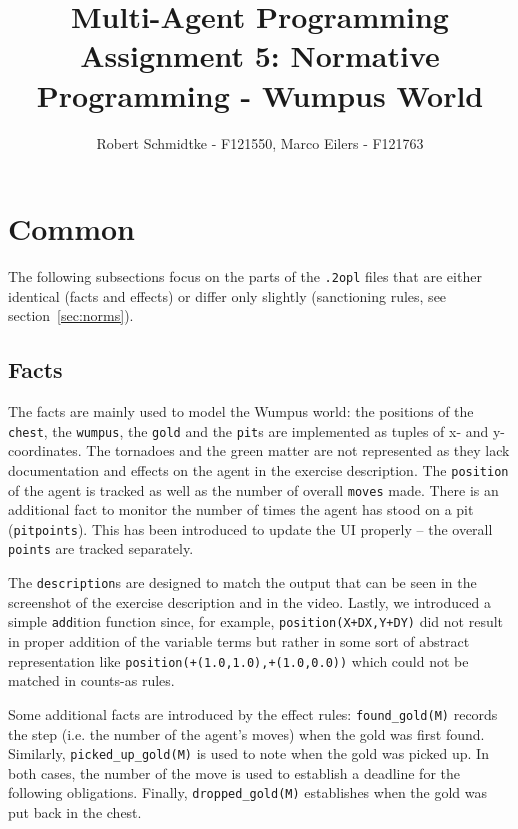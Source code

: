 \documentclass[a4paper,11pt]{article}
\begin{document}
\title{Multi-Agent Programming\\Assignment 5: Normative Programming - Wumpus World}
\author{Robert Schmidtke - F121550, Marco Eilers - F121763}

\maketitle
\newpage

\section{Common}
\label{sec:common}
The following subsections focus on the parts of the \texttt{.2opl} files that are either identical (facts and effects) or differ only slightly (sanctioning rules, see section~\ref{sec:norms}).

\subsection{Facts}
\label{sec:facts}
The facts are mainly used to model the Wumpus world: the positions of the \texttt{chest}, the \texttt{wumpus}, the \texttt{gold} and the \texttt{pit}s are implemented as tuples of x- and y-coordinates. The tornadoes and the green matter are not represented as they lack documentation and effects on the agent in the exercise description. The \texttt{position} of the agent is tracked as well as the number of overall \texttt{moves} made. There is an additional fact to monitor the number of times the agent has stood on a pit (\texttt{pitpoints}). This has been introduced to update the UI properly -- the overall \texttt{points} are tracked separately.

The \texttt{description}s are designed to match the output that can be seen in the screenshot of the exercise description and in the video. Lastly, we introduced a simple \texttt{add}ition function since, for example, \texttt{position(X+DX,Y+DY)} did not result in proper addition of the variable terms but rather in some sort of abstract representation like \texttt{position(+(1.0,1.0),+(1.0,0.0))} which could not be matched in counts-as rules.

Some additional facts are introduced by the effect rules: \texttt{found\_gold(M)} records the step (i.e. the number of the agent's moves) when the gold was first found. Similarly, \texttt{picked\_up\_gold(M)} is used to note when the gold was picked up. In both cases, the number of the move is used to establish a deadline for the following obligations. Finally, \texttt{dropped\_gold(M)} establishes when the gold was put back in the chest. 
\end{document}

